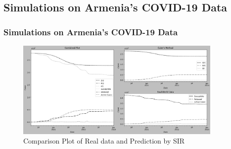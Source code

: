\documentclass{beamer}
\begin{document}
\subsection{Simulations on Armenia's COVID-19 Data}
\begin{frame}\frametitle{Simulations on Armenia's COVID-19 Data}
    \begin{figure}
        \caption{Comparison Plot of Real data and Prediction by SIR}
        \centering
        \includegraphics[width=10cm]{Figure_ArmPredict.png}
    \end{figure}
\end{frame}
\end{document}
